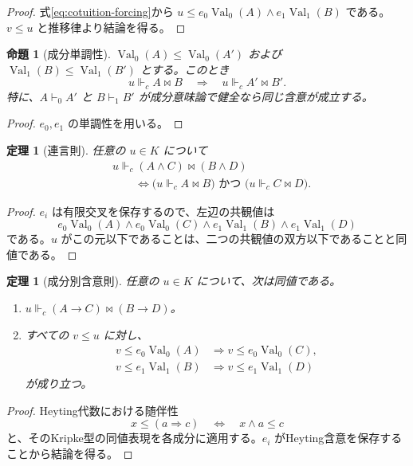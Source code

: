 \documentclass[a4paper,11pt]{ltjsarticle}
\theoremstyle{definition}
\theoremstyle{plain}
\newtheorem{theorem}[definition]{定理}
\newtheorem{proposition}[definition]{命題}
\newcommand{\Val}{\operatorname{Val}}
\newcommand{\forcesc}{\Vdash_{\!c}}
\begin{document}
\begin{proof}
式\eqref{eq:cotuition-forcing}から
$u\leq e_0\Val_0(A)\wedge e_1\Val_1(B)$ である。$v\leq u$ と推移律より結論を得る。
\end{proof}

\begin{proposition}[成分単調性]
$\Val_0(A)\leq\Val_0(A')$ および
$\Val_1(B)\leq\Val_1(B')$ とする。このとき
\[
 u\forcesc A\bowtie B
 \quad\Longrightarrow\quad
 u\forcesc A'\bowtie B'.
\]
特に、$A\vdash_0 A'$ と $B\vdash_1 B'$ が成分意味論で健全なら同じ含意が成立する。
\end{proposition}

\begin{proof}
$e_0,e_1$ の単調性を用いる。
\end{proof}

\begin{theorem}[連言則]
任意の $u\in K$ について
\begin{align}
 &u\forcesc (A\land C)\bowtie(B\land D)\\
 &\qquad\Longleftrightarrow
 \bigl(u\forcesc A\bowtie B\bigr)
 \text{ かつ }
 \bigl(u\forcesc C\bowtie D\bigr).
 \label{eq:conjunction-rule}
\end{align}
\end{theorem}

\begin{proof}
$e_i$ は有限交叉を保存するので、左辺の共観値は
\[
 e_0\Val_0(A)\wedge e_0\Val_0(C)
 \wedge e_1\Val_1(B)\wedge e_1\Val_1(D)
\]
である。$u$ がこの元以下であることは、二つの共観値の双方以下であることと同値である。
\end{proof}

\begin{theorem}[成分別含意則]
任意の $u\in K$ について、次は同値である。
\begin{enumerate}
 \item $u\forcesc(A\to C)\bowtie(B\to D)$。
 \item すべての $v\leq u$ に対し、
 \begin{align*}
  v\leq e_0\Val_0(A)&\Longrightarrow v\leq e_0\Val_0(C),\\
  v\leq e_1\Val_1(B)&\Longrightarrow v\leq e_1\Val_1(D)
 \end{align*}
 が成り立つ。
\end{enumerate}
\end{theorem}

\begin{proof}
Heyting代数における随伴性
\[
 x\leq(a\Rightarrow c)
 \quad\Longleftrightarrow\quad
 x\wedge a\leq c
\]
と、そのKripke型の同値表現を各成分に適用する。$e_i$ がHeyting含意を保存することから結論を得る。
\end{proof}
\end{document}
